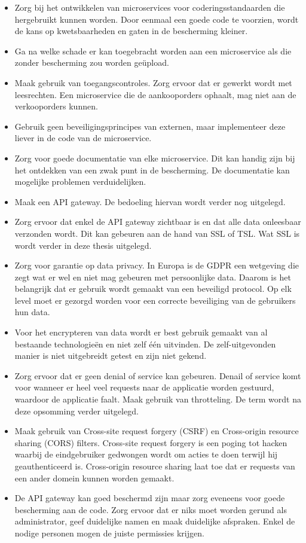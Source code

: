 \begin{itemize}
	\item Zorg bij het ontwikkelen van microservices voor coderingsstandaarden die hergebruikt kunnen worden. Door eenmaal een goede code te voorzien, wordt de kans op kwetsbaarheden en gaten in de bescherming kleiner.
	\item Ga na  welke schade er kan toegebracht worden aan een microservice als die zonder bescherming zou worden geüpload.
	\item Maak gebruik van toegangscontroles. Zorg ervoor dat er gewerkt wordt met leesrechten. Een microservice die de aankooporders ophaalt, mag niet aan de verkooporders kunnen.
	\item Gebruik geen beveiligingsprincipes van externen, maar implementeer deze liever in de code van de microservice.
	\item Zorg voor goede documentatie van elke microservice. Dit kan handig zijn bij het ontdekken van een zwak punt in de bescherming. De documentatie kan mogelijke problemen verduidelijken.
	\item Maak een API gateway. De bedoeling hiervan wordt verder nog uitgelegd.
	\item Zorg ervoor dat enkel de API gateway zichtbaar is en dat alle data onleesbaar verzonden wordt. Dit kan gebeuren aan de hand van SSL of TSL. Wat SSL is wordt verder in deze thesis uitgelegd. 
	\item Zorg voor garantie op data privacy. In Europa is de GDPR een  wetgeving die zegt wat er  wel en niet mag gebeuren met persoonlijke data. Daarom is het belangrijk dat er gebruik wordt gemaakt van een beveiligd protocol. Op elk level moet er gezorgd worden voor een correcte beveiliging van de gebruikers hun data. 
	\item Voor het encrypteren van data wordt er best gebruik gemaakt van al bestaande technologieën en niet zelf één uitvinden. De zelf-uitgevonden manier is niet uitgebreidt getest en zijn niet gekend.
	\item Zorg ervoor dat er geen denial of service kan gebeuren. Denail of service komt voor wanneer er heel veel requests naar de applicatie worden gestuurd, waardoor de applicatie faalt. Maak gebruik van throtteling. De term wordt na deze opsomming verder uitgelegd.
	\item Maak gebruik van Cross-site request forgery (CSRF) en Cross-origin resource sharing (CORS) filters. Cross-site request forgery is een poging tot hacken waarbij de eindgebruiker gedwongen wordt om acties te doen terwijl hij geauthenticeerd is. Cross-origin resource sharing laat toe dat er requests van een ander domein kunnen worden gemaakt. 
	\item De API gateway kan goed beschermd zijn maar zorg eveneens voor goede bescherming aan de code. Zorg ervoor dat er niks moet worden gerund als administrator, geef duidelijke namen en maak duidelijke afspraken. Enkel de nodige personen mogen de juiste permissies krijgen. 
\end{itemize}

